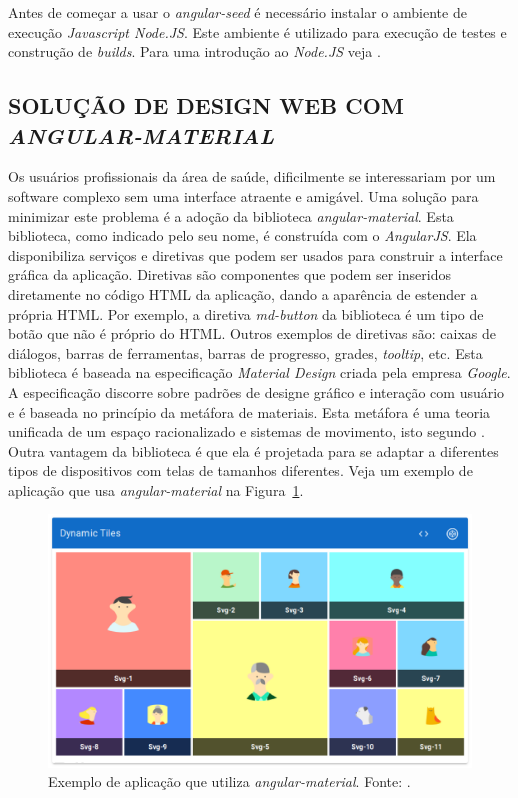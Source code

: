 Antes de começar a usar o \emph{angular-seed} é necessário instalar o ambiente de execução \emph{Javascript Node.JS}. 
Este ambiente é utilizado para execução de testes e construção de \emph{builds}. Para uma introdução ao \emph{Node.JS} veja .
\subsection{SOLUÇÃO DE DESIGN WEB COM \emph{ANGULAR-MATERIAL}}
\label{angular_material}

Os usuários profissionais da área de saúde, dificilmente se interessariam por um software complexo sem uma interface atraente e amigável.
Uma solução para minimizar este problema é a adoção da  biblioteca \emph{angular-material}. 
Esta biblioteca, como indicado pelo seu nome, é construída com o \emph{AngularJS}. 
Ela disponibiliza serviços e diretivas que podem ser usados para construir a interface gráfica da aplicação. 
Diretivas são componentes que podem ser inseridos diretamente no código HTML da aplicação, dando a aparência de estender a própria HTML. 
Por exemplo, a diretiva \emph{md-button} da biblioteca é um tipo de botão que não é próprio do HTML. 
Outros exemplos de diretivas são: caixas de diálogos, barras de ferramentas, barras de progresso, grades, \emph{tooltip}, etc. 
Esta biblioteca é baseada na especificação \emph{Material Design} criada pela empresa \emph{Google}. 
A especificação discorre sobre padrões de designe gráfico e interação com usuário e é baseada no princípio da metáfora de materiais. 
Esta metáfora é uma teoria unificada de um espaço racionalizado e sistemas de movimento, isto segundo . 
Outra vantagem da biblioteca é que ela é projetada para se adaptar a diferentes tipos de dispositivos com telas de tamanhos diferentes.
Veja um exemplo de aplicação que usa \emph{angular-material} na Figura~\ref{material_1}.


\begin{figure}[ht]
	\centering
	\includegraphics[width=14cm]{figuras/material.eps}
	\caption{Exemplo de aplicação que utiliza \emph{angular-material}. Fonte: .}
	\label{material_1}
\end{figure}



